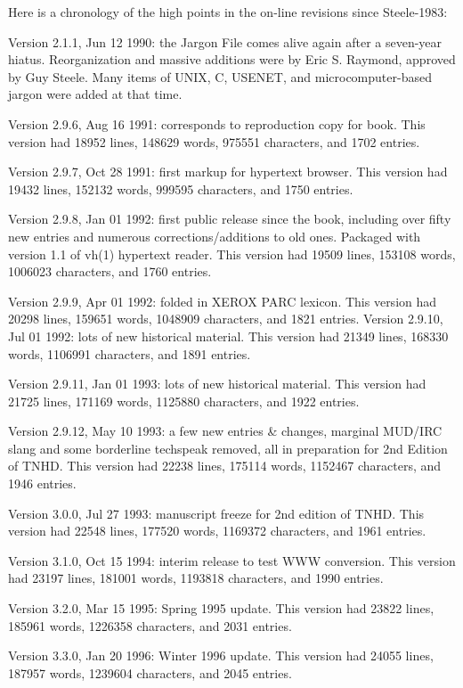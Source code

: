 Here is a chronology of the high points in the on-line revisions since
Steele-1983:

Version 2.1.1, Jun 12 1990: the Jargon File comes alive again after a
seven-year hiatus. Reorganization and massive additions were by Eric S.
Raymond, approved by Guy Steele. Many items of UNIX, C, USENET, and
microcomputer-based jargon were added at that time.

Version 2.9.6, Aug 16 1991: corresponds to reproduction copy for book. This
version had 18952 lines, 148629 words, 975551 characters, and 1702 entries.

Version 2.9.7, Oct 28 1991: first markup for hypertext browser. This version
had 19432 lines, 152132 words, 999595 characters, and 1750 entries.

Version 2.9.8, Jan 01 1992: first public release since the book, including over
fifty new entries and numerous corrections/additions to old ones. Packaged with
version 1.1 of vh(1) hypertext reader. This version had 19509 lines, 153108
words, 1006023 characters, and 1760
entries.

Version 2.9.9, Apr 01 1992: folded in XEROX PARC lexicon. This version had
20298 lines, 159651 words, 1048909 characters, and 1821 entries.  Version
2.9.10, Jul 01 1992: lots of new historical material. This version had 21349
lines, 168330 words, 1106991 characters, and 1891 entries.

Version 2.9.11, Jan 01 1993: lots of new historical material. This version had
21725 lines, 171169 words, 1125880 characters, and 1922 entries.

Version 2.9.12, May 10 1993: a few new entries \& changes, marginal MUD/IRC
slang and some borderline techspeak removed, all in preparation for 2nd Edition
of TNHD. This version had 22238 lines, 175114 words, 1152467 characters, and
1946 entries.

Version 3.0.0, Jul 27 1993: manuscript freeze for 2nd edition of TNHD. This
version had 22548 lines, 177520 words, 1169372 characters, and 1961 entries.

Version 3.1.0, Oct 15 1994: interim release to test WWW conversion. This
version had 23197 lines, 181001 words, 1193818 characters, and 1990 entries.

Version 3.2.0, Mar 15 1995: Spring 1995 update. This version had 23822 lines,
185961 words, 1226358 characters, and 2031 entries.

Version 3.3.0, Jan 20 1996: Winter 1996 update. This version had 24055 lines,
187957 words, 1239604 characters, and 2045 entries.

